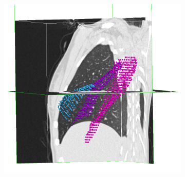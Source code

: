 {\begin{figure}[htbp]
\begin{subfigure}{.48\linewidth}
  \includegraphics[width=\linewidth,trim={{.0\wd0} {.0\wd0} {.0\wd0} {.0\wd0}},clip]{Segmentation/Image/LobeDigitising.png}
  \caption{}
  \label{fig:LobeShapeGenereation-c} 
\end{subfigure}
\hspace{.3in} %
\begin{subfigure}{.32\linewidth}%

\end{subfigure}
\end{figure}}
